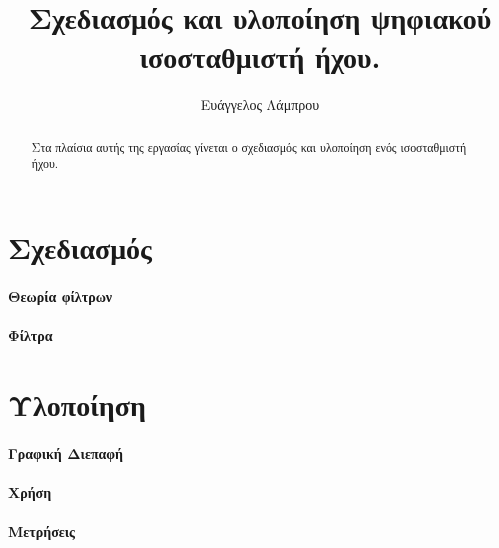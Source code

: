 \documentclass[review]{article}
\begin{document}
\begin{titlepage}

\title{Σχεδιασμός και υλοποίηση ψηφιακού ισοσταθμιστή ήχου.}

\author{Ευάγγελος Λάμπρου}
\date{}

\maketitle

\begin{abstract}
    Στα πλαίσια αυτής της εργασίας γίνεται ο σχεδιασμός και υλοποίηση 
    ενός ισοσταθμιστή ήχου. 
\end{abstract}


\end{titlepage}

\linenumbers

\section{Σχεδιασμός}
\paragraph{Θεωρία  φίλτρων}
\paragraph{Φίλτρα } 

\section{Υλοποίηση}

\paragraph{Γραφική Διεπαφή}
\paragraph{Χρήση}
\paragraph{Μετρήσεις}

\cite{Dirac1953888}


\end{document}

